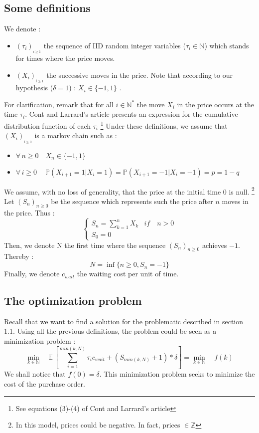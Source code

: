 \documentclass{article}
\begin{document}
\subsection{Some definitions}
We denote :
\begin{itemize}
\item $(\tau_{i})_{_{i \geq 1}}$ the sequence of IID random integer variables  ($\tau_{i} \in \mathbb{N}$) which stands for times where the price moves.
\item $(X_{i})_{_{i \geq 1}}$ the successive moves in the price. Note that according to our hypothesis ($\delta = 1$) : $X_{i} \in \{-1,1\}$ .
\end{itemize}
For clarification, remark that for all $ i \in \mathbb{N^{*}} $ the move $X_{i}$ in the price occurs at the time $\tau_{i}$.\newline
Cont and Larrard's article presents an expression for the cumulative distribution function of each $\tau_{i}$ \footnote{See equations (3)-(4) of Cont and Larrard's article}
\newline
Under these definitions, we assume that $(X_{i})_{_{i \geq 0}}$ is a markov chain such as :
\begin{itemize}
\item $\forall \, n\geq0 \quad X_{n} \in \{-1,1\} $ 
\item $\forall \, i\geq0 \quad\ \mathbb{P}( X_{i+1}=1 | X_{i}=1 ) = \mathbb{P}( X_{i+1}=-1 | X_{i}=-1 ) = p = 1-q$
\end{itemize}
We assume, with no loss of generality, that the price at the initial time 0 is null. \footnote{In this model, prices could be negative. In fact, prices $\in \mathbb{Z}$}
Let $(S_{n})_{n\geq0}$ be the sequence which represents such the price after $n$ moves in the price. Thus :
\begin{equation*}
     \begin{cases}
        S_{n} = \sum_{k=1}^{n}X_{k} & if \quad n > 0 \\
        S_{0} = 0
     \end{cases}
\end{equation*}
Then, we denote N the first time where the sequence $(S_{n})_{n\geq0}$  achieves $-1$. Thereby :
$$ N= \inf \{ n\geq0 , S_{n}=-1   \} $$
Finally, we denote $c_{wait}$ the waiting cost per unit of time.


\subsection{The optimization problem}
Recall that we want to find a solution for the problematic described in section 1.1.
Using all the previous definitions, the problem could be seen as a minimization problem  :
\begin{equation}
\min\limits_{k \in \mathbb{N}} \quad \mathbb{E}\,\left[ \sum_{i=1}^{min(k,N)}\tau_{i} c_{wait} + (S_{min(k,N)}+1)*\delta\right] = \min\limits_{k \in \mathbb{N}} \quad f(k)
\end{equation}
We shall notice that $f(0) = \delta$. This minimization problem seeks to minimize the cost of the purchase order. 
\end{document}

